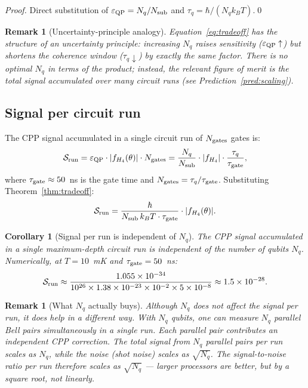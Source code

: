 \documentclass[11pt,a4paper]{article}
\newtheorem{corollary}[theorem]{Corollary}
\newtheorem{remark}[theorem]{Remark}
\newcommand{\eps}{\varepsilon}
\begin{document}
\begin{proof}
Direct substitution of $\eps_{\rm QP} = N_q/N_{\rm sub}$ and
$\tau_q = \hbar/(N_q k_B T)$.\qed
\end{proof}

\begin{remark}[Uncertainty-principle analogy]
Equation~\eqref{eq:tradeoff} has the structure of an uncertainty
principle: increasing $N_q$ raises sensitivity ($\eps_{\rm QP}
\uparrow$) but shortens the coherence window ($\tau_q \downarrow$)
by exactly the same factor.  There is no optimal $N_q$ in terms of
the product; instead, the relevant figure of merit is the total
signal accumulated over many circuit runs (see
Prediction~\ref{pred:scaling}).
\end{remark}

\subsection{Signal per circuit run}

The CPP signal accumulated in a single circuit run of $N_{\rm
gates}$ gates is:
\begin{equation}
\mathcal{S}_{\rm run}
= \eps_{\rm QP} \cdot |f_{H_4}(\theta)| \cdot N_{\rm gates}
= \frac{N_q}{N_{\rm sub}} \cdot |f_{H_4}|
  \cdot \frac{\tau_q}{\tau_{\rm gate}},
\label{eq:signal_run}
\end{equation}
where $\tau_{\rm gate} \approx 50$~ns is the gate time and
$N_{\rm gates} = \tau_q / \tau_{\rm gate}$.  Substituting
Theorem~\ref{thm:tradeoff}:
\begin{equation}
\mathcal{S}_{\rm run}
= \frac{\hbar}{N_{\rm sub}\, k_B T \cdot \tau_{\rm gate}}
  \cdot |f_{H_4}(\theta)|.
\label{eq:signal_independent}
\end{equation}

\begin{corollary}[Signal per run is independent of $N_q$]
\label{cor:Nq_independent}
The CPP signal accumulated in a single maximum-depth circuit run is
independent of the number of qubits $N_q$.  Numerically, at
$T = 10$~mK and $\tau_{\rm gate} = 50$~ns:
\begin{equation}
\mathcal{S}_{\rm run} \approx
\frac{1.055\times10^{-34}}{10^{26} \times 1.38\times10^{-23}
\times 10^{-2} \times 5\times10^{-8}}
\approx 1.5 \times 10^{-28}.
\label{eq:Srun_numeric}
\end{equation}
\end{corollary}

\begin{remark}[What $N_q$ actually buys]
Although $N_q$ does not affect the signal per run, it does help
in a different way.  With $N_q$ qubits, one can measure $N_q$
parallel Bell pairs \emph{simultaneously} in a single run.  Each
parallel pair contributes an independent CPP correction.  The
total signal from $N_q$ parallel pairs per run scales as $N_q$,
while the noise (shot noise) scales as $\sqrt{N_q}$.  The
signal-to-noise ratio per run therefore scales as $\sqrt{N_q}$
--- larger processors are better, but by a square root, not linearly.
\end{remark}
\end{document}
